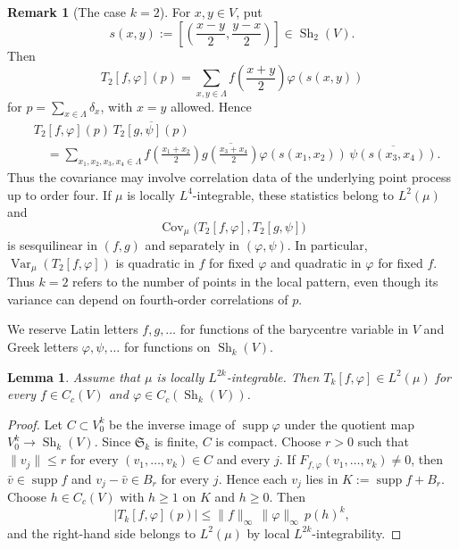 \documentclass[11pt,reqno,a4paper]{amsart}
\numberwithin{equation}{section}
\theoremstyle{compact}
\newtheorem{lemma}[lemma]{Lemma}
\theoremstyle{definition}
\theoremstyle{definition}
\newtheorem{remark}[theorem]{Remark}
\newcommand{\Var}{\operatorname{Var}}
\newcommand{\Cov}{\operatorname{Cov}}
\newcommand{\Sh}{\operatorname{Sh}}
\begin{document}
\begin{remark}[The case $k=2$]\label{rem:k2-expanded}
For $x,y\in V$, put
\[
  s(x,y):=\left[\left(\frac{x-y}{2},\frac{y-x}{2}\right)\right]
  \in\Sh_2(V).
\]
Then
\begin{equation}\label{eq:k2-expanded-statistic}
  T_2[f,\varphi](p)
  =\sum_{x,y\in\Lambda}
     f\!\left(\frac{x+y}{2}\right)\varphi(s(x,y))
\end{equation}
for $p=\sum_{x\in\Lambda}\delta_x$, with $x=y$ allowed.  Hence
\[
\begin{aligned}
&T_2[f,\varphi](p)\,\overline{T_2[g,\psi](p)} \\
&\quad=\sum_{x_1,x_2,x_3,x_4\in\Lambda}
  f\!\left(\frac{x_1+x_2}{2}\right)
  \overline{g\!\left(\frac{x_3+x_4}{2}\right)}
  \varphi(s(x_1,x_2))\,
  \overline{\psi(s(x_3,x_4))}.
\end{aligned}
\]
Thus the covariance may involve correlation data of the underlying point
process up to order four.  If $\mu$ is locally $L^4$-integrable, these
statistics belong to $L^2(\mu)$ and
\[
  \Cov_\mu\bigl(T_2[f,\varphi],T_2[g,\psi]\bigr)
\]
is sesquilinear in $(f,g)$ and separately in $(\varphi,\psi)$.  In
particular, $\Var_\mu(T_2[f,\varphi])$ is quadratic in $f$ for fixed
$\varphi$ and quadratic in $\varphi$ for fixed $f$.  Thus $k=2$ refers to
the number of points in the local pattern, even though its variance can
depend on fourth-order correlations of $p$.
\end{remark}

We reserve Latin letters $f,g,\ldots$ for functions of the barycentre variable in $V$ and Greek letters $\varphi,\psi,\ldots$ for functions on $\Sh_k(V)$.

\begin{lemma}\label{lem:pattern-statistics-L2}
Assume that $\mu$ is locally $L^{2k}$-integrable.  Then
$T_k[f,\varphi]\in L^2(\mu)$ for every $f\in C_c(V)$ and
$\varphi\in C_c(\Sh_k(V))$.
\end{lemma}

\begin{proof}
Let $C\subset V_0^k$ be the inverse image of $\operatorname{supp}\varphi$
under the quotient map $V_0^k\to\Sh_k(V)$.  Since $\mathfrak S_k$ is finite,
$C$ is compact.  Choose $r>0$ such that $\|v_j\|\leq r$ for every
$(v_1,\ldots,v_k)\in C$ and every $j$.  If
$F_{f,\varphi}(v_1,\ldots,v_k)\neq0$, then
$\bar v\in\operatorname{supp}f$ and $v_j-\bar v\in B_r$ for every $j$.
Hence each $v_j$ lies in
$K:=\operatorname{supp}f+B_r$.  Choose $h\in C_c(V)$ with $h\geq1$ on $K$
and $h\geq0$.  Then
\begin{equation}\label{eq:pattern-statistic-L2-bound}
  |T_k[f,\varphi](p)|
  \leq \|f\|_\infty\,\|\varphi\|_\infty\,p(h)^k,
\end{equation}
and the right-hand side belongs to $L^2(\mu)$ by local
$L^{2k}$-integrability.
\end{proof}
\end{document}
